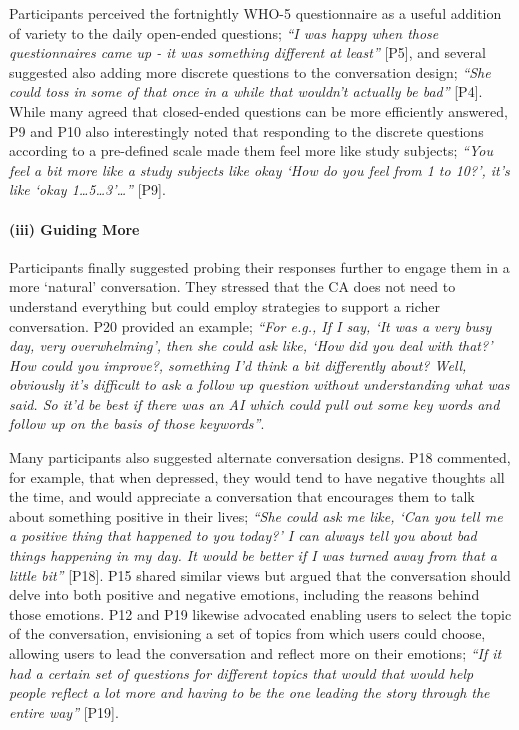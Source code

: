                 Participants perceived the fortnightly \ac{WHO-5} questionnaire as a useful addition of variety to the daily open-ended questions; \textit{``I was happy when those questionnaires came up - it was something different at least''} [P5], and several suggested also adding more discrete questions to the conversation design; \textit{``She could toss in some of that once in a while that wouldn't actually be bad''} [P4]. While many agreed that closed-ended questions can be more efficiently answered, P9 and P10 also interestingly noted that responding to the discrete questions according to a pre-defined scale made them feel more like study subjects; \textit{``You feel a bit more like a study subjects like okay `How do you feel from 1 to 10?', it's like `okay 1\ldots 5\ldots 3'\ldots''} [P9]. 
                
            \paragraph{(iii) Guiding More}
                
                Participants finally suggested probing their responses further to engage them in a more `natural' conversation. They stressed that the \ac{CA} does not need to understand everything but could employ strategies to support a richer conversation. P20 provided an example; \textit{``For e.g., If I say, `It was a very busy day, very overwhelming', then she could ask like, `How did you deal with that?' How could you improve?, something I’d think a bit differently about? Well, obviously it’s difficult to ask a follow up question without understanding what was said. So it’d be best if there was an \ac{AI} which could pull out some key words and follow up on the basis of those keywords''}.

                Many participants also suggested alternate conversation designs. P18 commented, for example, that when depressed, they would tend to have negative thoughts all the time, and would appreciate a conversation that encourages them to talk about something positive in their lives; \textit{``She could ask me like, `Can you tell me a positive thing that happened to you today?' I can always tell you about bad things happening in my day. It would be better if I was turned away from that a little bit''} [P18]. P15 shared similar views but argued that the conversation should delve into both positive and negative emotions, including the reasons behind those emotions. P12 and P19 likewise advocated enabling users to select the topic of the conversation, envisioning a set of topics from which users could choose, allowing users to lead the conversation and reflect more on their emotions; \textit{``If it had a certain set of questions for different topics that would that would help people reflect a lot more and having to be the one leading the story through the entire way''} [P19].
            

